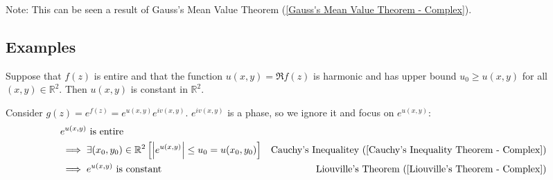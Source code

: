 \documentclass[12pt, english]{book}
\makeatletter
\renewenvironment{proof}[1][\proofname]{\par
	\pushQED{\qed}%
	\normalfont \topsep6\p@\@plus6\p@\relax
	\list{}{%
		\settowidth{\leftmargin}{\itshape\proofname:\hskip\labelsep}%
		\setlength{\labelwidth}{0pt}%
		\setlength{\itemindent}{-\leftmargin}%
		}%
	\item[\hskip\labelsep\itshape#1\@addpunct{:}]\ignorespaces
	}{\popQED\endlist\@endpefalse}
\makeatother
\begin{document}
	Note: This can be seen a result of Gauss's Mean Value Theorem (\cref{Gauss's Mean Value Theorem - Complex}).

	\subsection{Examples} \label{Maximum Modulus Principle Examples Subsection - Complex}
	
	\begin{example}
		Suppose that \(f(z)\) is entire and that the function \(u(x,y) = \Re{f(z)}\) is harmonic and has upper bound \(u_0 \geq u(x,y)\) for all \((x,y) \in \mathbb{R}^2\). Then \(u(x,y)\) is constant in \(\mathbb{R}^2\).
		\begin{proof}
			{\color{Grey}
				Consider \(g(z) = e^{f(z)} = e^{u(x,y)}  e^{iv(x,y)}\). \(e^{iv(x,y)}\) is a phase, so we ignore it and focus on \(e^{u(x,y)}\):
				\begin{align*}
					&e^{u(x,y)} \text{ is entire} \\
					&\implies \exists(x_0, y_0) \in \mathbb{R}^2
					\left[\abs{e^{u(x,y)}} \leq u_0 = u(x_0, y_0) \right] 
					& \text{Cauchy's Inequalitey } (\Cref{Cauchy's Inequality Theorem - Complex}) \\
					&\implies  e^{u(x,y)} \text{ is constant}
					& \text{Liouville's Theorem } (\Cref{Liouville's Theorem - Complex})
				\end{align*}
			}
		\end{proof}
	\end{example}
\end{document}
